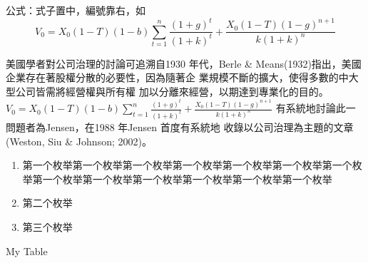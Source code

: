 \documentclass[
    添加扉页=是,
    添加原創聲明頁=是,
    添加校徽水印=是,
    奇偶页邊距對稱=不,
]{.def/must}
\begin{document}
\noindent 公式：式子置中，編號靠右，如
\begin{equation}
V_0=X_0(1-T)(1-b) \sum_{t=1}^n \frac{(1+g)^t}{(1+k)^t}+\frac{X_0(1-T)(1-g)^{n+1}}{k(1+k)^n}
\end{equation}


\par 美國學者對公司治理的討論可追溯自1930 年代，Berle \&
Means(1932)指出，美國企業存在著股權分散的必要性，因為隨著企
業規模不斷的擴大，使得多數的中大型公司皆需將經營權與所有權
加以分離來經營，以期達到專業化的目的。
$V_0=X_0(1-T)(1-b) \sum_{t=1}^n \frac{(1+g)^t}{(1+k)^t}+\frac{X_0(1-T)(1-g)^{n+1}}{k(1+k)^n}$ 
有系統地討論此一問題者為Jensen，在1988 年Jensen 首度有系統地
收錄以公司治理為主題的文章(Weston, Siu \& Johnson; 2002)。
\begin{enumerate}
\item 第一个枚举第一个枚举第一个枚举第一个枚举第一个枚举第一个枚举第一个枚举第一个枚举第一个枚举第一个枚举第一个枚举第一个枚举第一个枚举 
\item 第二个枚举 
\item 第三个枚举 
\end{enumerate}

\begin{table}[htbp]
    \centering
    \caption{My Table}
    \label{tab:mytable}
\end{table}
\end{document}
